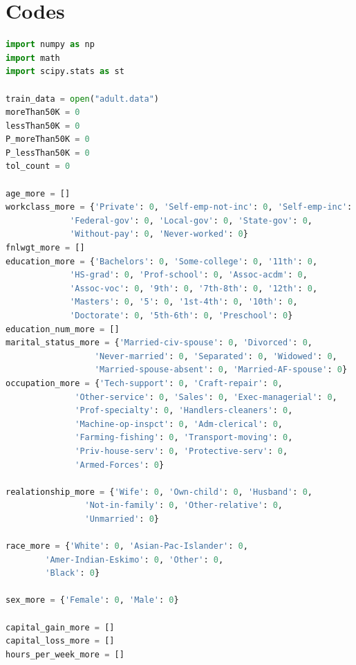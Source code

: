 ﻿\documentclass[a4paper, 11pt]{article}
\begin{document}
\section{Codes}
\begin{lstlisting}[language=Python,frame=single]
import numpy as np
import math
import scipy.stats as st

train_data = open("adult.data")
moreThan50K = 0
lessThan50K = 0
P_moreThan50K = 0
P_lessThan50K = 0
tol_count = 0

age_more = []
workclass_more = {'Private': 0, 'Self-emp-not-inc': 0, 'Self-emp-inc': 0,
             'Federal-gov': 0, 'Local-gov': 0, 'State-gov': 0,
             'Without-pay': 0, 'Never-worked': 0}
fnlwgt_more = []
education_more = {'Bachelors': 0, 'Some-college': 0, '11th': 0,
             'HS-grad': 0, 'Prof-school': 0, 'Assoc-acdm': 0,
             'Assoc-voc': 0, '9th': 0, '7th-8th': 0, '12th': 0,
             'Masters': 0, '5': 0, '1st-4th': 0, '10th': 0,
             'Doctorate': 0, '5th-6th': 0, 'Preschool': 0}
education_num_more = []
marital_status_more = {'Married-civ-spouse': 0, 'Divorced': 0,
                  'Never-married': 0, 'Separated': 0, 'Widowed': 0,
                  'Married-spouse-absent': 0, 'Married-AF-spouse': 0}
occupation_more = {'Tech-support': 0, 'Craft-repair': 0,
              'Other-service': 0, 'Sales': 0, 'Exec-managerial': 0,
              'Prof-specialty': 0, 'Handlers-cleaners': 0,
              'Machine-op-inspct': 0, 'Adm-clerical': 0,
              'Farming-fishing': 0, 'Transport-moving': 0,
              'Priv-house-serv': 0, 'Protective-serv': 0,
              'Armed-Forces': 0}

realationship_more = {'Wife': 0, 'Own-child': 0, 'Husband': 0,
                'Not-in-family': 0, 'Other-relative': 0,
                'Unmarried': 0}

race_more = {'White': 0, 'Asian-Pac-Islander': 0,
        'Amer-Indian-Eskimo': 0, 'Other': 0,
        'Black': 0}

sex_more = {'Female': 0, 'Male': 0}

capital_gain_more = []
capital_loss_more = []
hours_per_week_more = []


\end{lstlisting}
\end{document}
